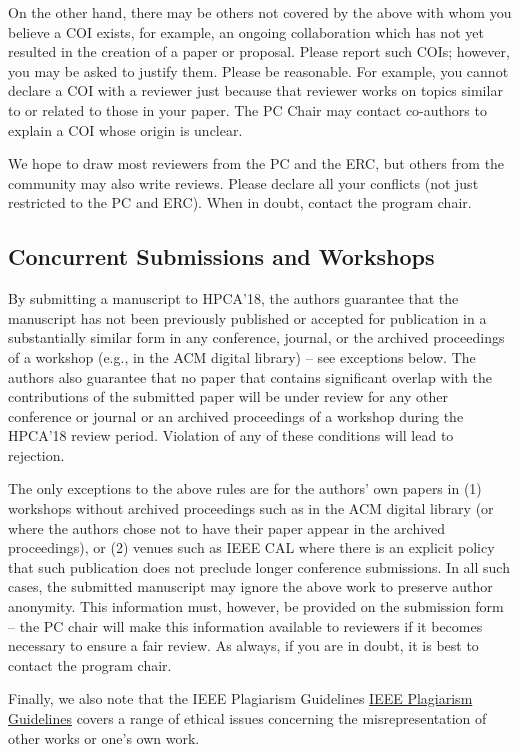 \documentclass{sig-alternate}
\begin{document}
On the other hand, there may be others not covered by the above with
whom you believe a COI exists, for example, an ongoing collaboration
which has not yet resulted in the creation of a paper or proposal.
Please report such COIs; however, you may be asked to justify them.
Please be reasonable. For example, you cannot declare a COI with a
reviewer just because that reviewer works on topics similar to or
related to those in your paper.  The PC Chair may contact co-authors
to explain a COI whose origin is unclear.

We hope to draw most reviewers from the PC and the ERC, but others from the
community may also write reviews.  Please declare all your conflicts (not
just restricted to the PC and ERC).  When in doubt, contact the program
chair.

\subsection{Concurrent Submissions and Workshops}

By submitting a manuscript to HPCA'18, the authors guarantee that the
manuscript has not been previously published or accepted for publication in
a substantially similar form in any conference, journal, or the archived
proceedings of a workshop (e.g., in the ACM digital library) -- see
exceptions below. The authors also guarantee that no paper that contains
significant overlap with the contributions of the submitted paper will be
under review for any other conference or journal or an archived proceedings
of a workshop during the HPCA'18 review period. Violation of any of these
conditions will lead to rejection.

The only exceptions to the above rules are for the authors' own papers
in (1) workshops without archived proceedings such as in the ACM
digital library (or where the authors chose not to have their paper
appear in the archived proceedings), or (2) venues such as IEEE CAL
where there is an explicit policy that such publication does not
preclude longer conference submissions.  In all such cases, the
submitted manuscript may ignore the above work to preserve author
anonymity. This information must, however, be provided on the
submission form -- the PC chair will make this information available
to reviewers if it becomes necessary to ensure a fair review.  As
always, if you are in doubt, it is best to contact the program chair.


Finally, we also note that the IEEE Plagiarism Guidelines \href{http://www.ieee.org/publications\_standards/publications/rights/plagiarism.html}{IEEE Plagiarism Guidelines} covers a range of ethical issues concerning the misrepresentation of other works or
one's own work.
\end{document}
